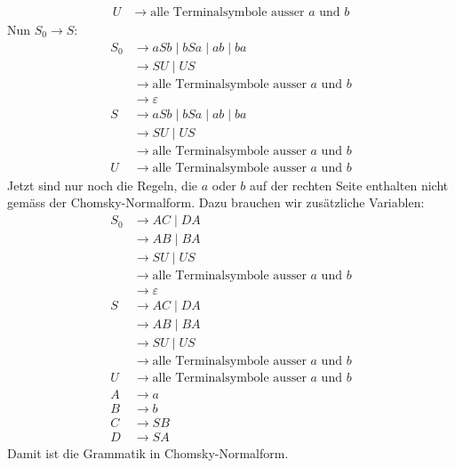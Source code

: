\begin{loesung}
\begin{teilaufgaben}
\begin{align*}
U  &\rightarrow \text{alle Terminalsymbole ausser $a$ und $b$}
\end{align*}
Nun $S_0\rightarrow S$:
\begin{align*}
S_0&\rightarrow aSb\;|\; bSa\;|\;ab\;|\;ba\\
   &\rightarrow SU \;|\; US\\
   &\rightarrow \text{alle Terminalsymbole ausser $a$ und $b$}\\
   &\rightarrow \varepsilon\\
S  &\rightarrow aSb\;|\; bSa\;|\;ab\;|\;ba\\
   &\rightarrow SU \;|\; US\\
   &\rightarrow \text{alle Terminalsymbole ausser $a$ und $b$}\\
U  &\rightarrow \text{alle Terminalsymbole ausser $a$ und $b$}
\end{align*}
Jetzt sind nur noch die Regeln, die $a$ oder $b$ auf der rechten
Seite enthalten nicht gemäss der Chomsky-Normalform.
Dazu brauchen wir zusätzliche Variablen:
\begin{align*}
S_0&\rightarrow AC\;|\; DA \\
   &\rightarrow AB\;|\;BA\\
   &\rightarrow SU \;|\; US\\
   &\rightarrow \text{alle Terminalsymbole ausser $a$ und $b$}\\
   &\rightarrow \varepsilon\\
S  &\rightarrow AC\;|\; DA \\
   &\rightarrow AB\;|\;BA\\
   &\rightarrow SU \;|\; US\\
   &\rightarrow \text{alle Terminalsymbole ausser $a$ und $b$}\\
U  &\rightarrow \text{alle Terminalsymbole ausser $a$ und $b$}\\
A  &\rightarrow a \\
B  &\rightarrow b \\
C  &\rightarrow SB \\
D  &\rightarrow SA
\end{align*}
Damit ist die Grammatik in Chomsky-Normalform.
\qedhere
\end{teilaufgaben}
\end{loesung}

